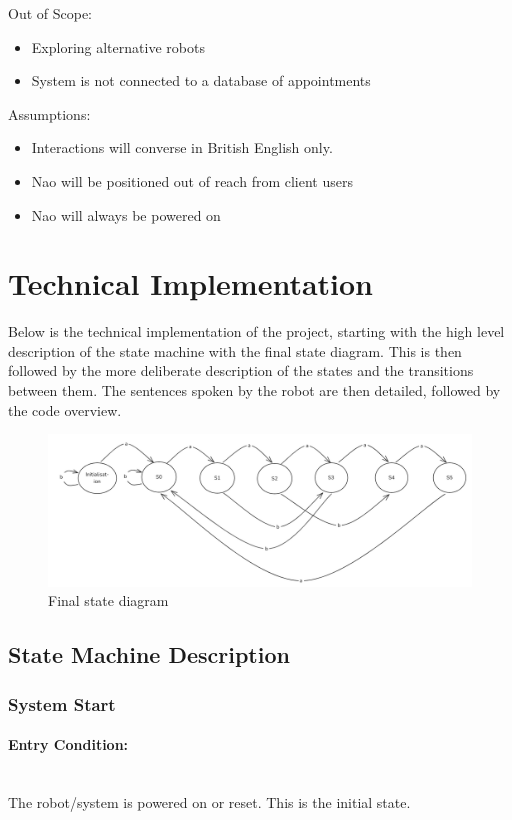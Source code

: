 \documentclass[conference]{IEEEtran}
\begin{document}
Out of Scope:
\begin{itemize}
        \item Exploring alternative robots
        \item System is not connected to a database of appointments 
\end{itemize}

Assumptions:
\begin{itemize}
        \item Interactions will converse in British English only.
        \item Nao will be positioned out of reach from client users
        \item Nao will always be powered on
\end{itemize}

\section{Technical Implementation}

Below is the technical implementation of the project, starting with the high level description of the state machine with the final state diagram. This is then
followed by the more deliberate description of the states and the transitions between them. The sentences spoken by the robot are then detailed,
followed by the code overview. 

\begin{figure}
  \centering
  \includegraphics[width=.9\linewidth]{Final state diagram.png}
  \caption{Final state diagram}
  \label{Final state diagram}
\end{figure}

\subsection{State Machine Description}

\subsubsection{System Start}
\paragraph{Entry Condition:}
\mbox{}\\
The robot/system is powered on or reset. This is the initial state.
\end{document}
